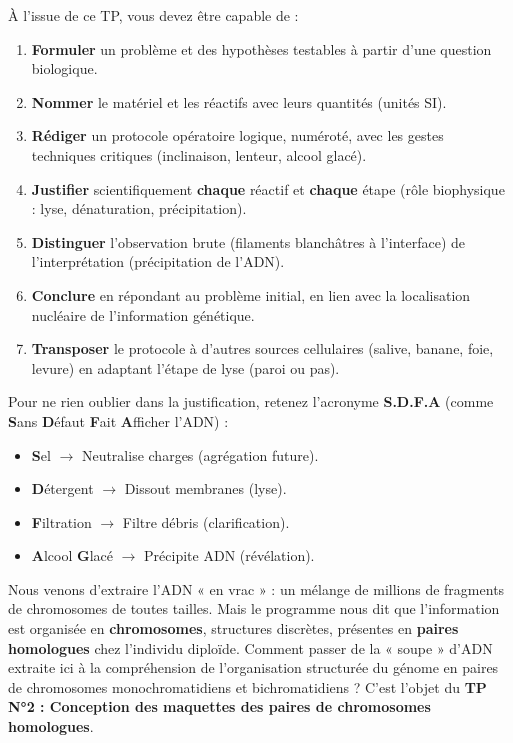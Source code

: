 \documentclass[11pt]{article}
\newcounter{popsec}
\newcounter{popsub}
\newcommand{\courssub}[1]{%
  \stepcounter{popsub}%
  \par\vspace{9pt}\noindent{\popxbold\fontsize{11.5}{13}\selectfont\color{popink}{\color{poporange}\thepopsec.\thepopsub}\hspace{6pt}#1}\par\nopagebreak\vspace{4pt}
}
\begin{document}
\begin{aretenir}
À l'issue de ce TP, vous devez être capable de :
\begin{enumerate}
    \item \textbf{Formuler} un problème et des hypothèses testables à partir d'une question biologique.
    \item \textbf{Nommer} le matériel et les réactifs avec leurs quantités (unités SI).
    \item \textbf{Rédiger} un protocole opératoire logique, numéroté, avec les gestes techniques critiques (inclinaison, lenteur, alcool glacé).
    \item \textbf{Justifier} scientifiquement \textbf{chaque} réactif et \textbf{chaque} étape (rôle biophysique : lyse, dénaturation, précipitation).
    \item \textbf{Distinguer} l'observation brute (filaments blanchâtres à l'interface) de l'interprétation (précipitation de l'ADN).
    \item \textbf{Conclure} en répondant au problème initial, en lien avec la localisation nucléaire de l'information génétique.
    \item \textbf{Transposer} le protocole à d'autres sources cellulaires (salive, banane, foie, levure) en adaptant l'étape de lyse (paroi ou pas).
\end{enumerate}
\end{aretenir}

\begin{exemplebox}
Pour ne rien oublier dans la justification, retenez l'acronyme \textbf{S.D.F.A} (comme \textbf{S}ans \textbf{D}éfaut \textbf{F}ait \textbf{A}fficher l'ADN) :
\begin{itemize}
    \item \textbf{S}el $\rightarrow$ Neutralise charges (agrégation future).
    \item \textbf{D}étergent $\rightarrow$ Dissout membranes (lyse).
    \item \textbf{F}iltration $\rightarrow$ Filtre débris (clarification).
    \item \textbf{A}lcool \textbf{G}lacé $\rightarrow$ Précipite ADN (révélation).
\end{itemize}
\end{exemplebox}

\courssub{Passerelle vers le TP N°2}

Nous venons d'extraire l'ADN « en vrac » : un mélange de millions de fragments de chromosomes de toutes tailles. Mais le programme nous dit que l'information est organisée en \textbf{chromosomes}, structures discrètes, présentes en \textbf{paires homologues} chez l'individu diploïde. Comment passer de la « soupe » d'ADN extraite ici à la compréhension de l'organisation structurée du génome en paires de chromosomes monochromatidiens et bichromatidiens ? C'est l'objet du \textbf{TP N°2 : Conception des maquettes des paires de chromosomes homologues}.
\end{document}
